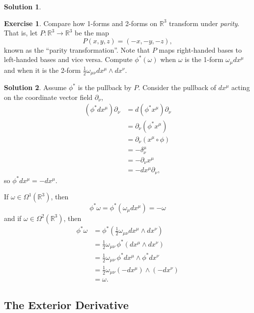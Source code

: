 \documentclass[11pt, a4paper]{article}
\theoremstyle{definition}
\newtheorem{ex}{Exercise}[part]
\newtheorem{sol}{Solution}[part]
\begin{document}
\begin{sol}
\end{sol}

\begin{ex}

Compare how 1-forms and 2-forms on $\mathbb{R}^3$ transform under \emph{parity}. That is, let $P: \mathbb{R}^3 \to \mathbb{R}^3$ be the map
\[
    P(x, y, z) = (-x, -y, -z),
\]
known as the ``parity transformation''. Note that $P$ maps right-handed bases to left-handed bases and vice versa. Compute $\phi^*(\omega)$ when $\omega$ is the 1-form $\omega_\mu dx^\mu$ and when it is the 2-form $\frac{1}{2}\omega_{\mu\nu}dx^\mu \wedge dx^\nu$.

\end{ex}

\begin{sol}

Assume $\phi^*$ is the pullback by $P$. Consider the pullback of $dx^\mu$ acting on the coordinate vector field $\partial_\nu$,
\begin{align*}
    (\phi^* dx^\mu) \partial_\nu &= d(\phi^* x^\mu) \partial_\nu \\
        &= \partial_\nu (\phi^* x^\mu) \\
        &= \partial_\nu (x^\mu \circ \phi) \\
        &= -\delta_\nu^\mu \\
        &= -\partial_\nu x^\mu \\
        &= - dx^\mu \partial_\nu,
\end{align*}
so $\phi^* dx^\mu = -dx^\mu$.

If $\omega \in \Omega^1(\mathbb{R}^3)$, then
\[
    \phi^* \omega = \phi^*(\omega_\mu dx^\mu) = -\omega
\]
and if $\omega \in \Omega^2(\mathbb{R}^3)$, then
\begin{align*}
    \phi^* \omega &= \phi^*\left(\tfrac{1}{2}\omega_{\mu\nu} dx^\mu \wedge dx^\nu\right) \\
        &= \tfrac{1}{2}\omega_{\mu\nu} \, \phi^*(dx^\mu \wedge dx^\nu) \\
        &= \tfrac{1}{2}\omega_{\mu\nu} \, \phi^* dx^\mu \wedge \phi^* dx^\nu \\
        &= \tfrac{1}{2}\omega_{\mu\nu} (-dx^\mu) \wedge (-dx^\nu) \\
        &= \omega.
\end{align*}

\end{sol}

\subsection{The Exterior Derivative}
\end{document}
